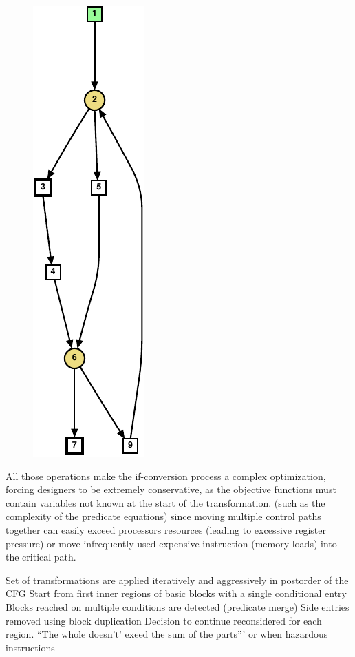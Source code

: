 \begin{figure}
{    \includegraphics[scale=0.6]{graph7}
    \label{fig:wc2}}
\label{fig:wc example}
\end{figure}

All those operations make the if-conversion process a complex optimization, forcing designers to be extremely conservative, as the objective functions must contain variables not known at the start of the transformation. (such as the complexity of the predicate equations) since moving multiple control paths together can easily exceed processors resources (leading to excessive register pressure) or move infrequently used expensive instruction (memory loads) into the critical path. 

Set of transformations are applied iteratively and aggressively in postorder of the CFG
Start from first inner regions of basic blocks with a single conditional entry
Blocks reached on multiple conditions are detected (predicate merge)
Side entries removed using block duplication 
Decision to continue reconsidered for each region. ``The whole doesn't' exeed the sum of the parts''' or when hazardous instructions

